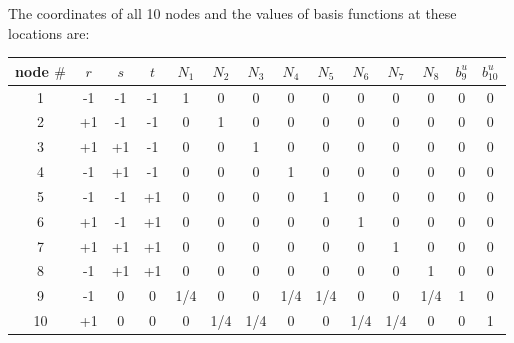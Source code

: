 The coordinates of all 10 nodes and the values of basis functions at these locations are:

\begin{center}
\begin{tabular}{c|ccc|cccccccc|cc}
\hline
node $\#$  & $r$ & $s$ & $t$ & $N_1$ & $N_2$ & $N_3$ & $N_4$ & $N_5$ & $N_6$ & $N_7$ & $N_8$ & $b_9^u$ & $b_{10}^u$\\
\hline\hline
1 & -1 & -1 & -1 & 1 & 0 & 0 & 0 & 0 & 0 & 0 & 0 & 0 & 0\\
2 & +1 & -1 & -1 & 0 & 1 & 0 & 0 & 0 & 0 & 0 & 0 & 0 & 0\\
3 & +1 & +1 & -1 & 0 & 0 & 1 & 0 & 0 & 0 & 0 & 0 & 0 & 0\\
4 & -1 & +1 & -1 & 0 & 0 & 0 & 1 & 0 & 0 & 0 & 0 & 0 & 0\\
5 & -1 & -1 & +1 & 0 & 0 & 0 & 0 & 1 & 0 & 0 & 0 & 0 & 0\\
6 & +1 & -1 & +1 & 0 & 0 & 0 & 0 & 0 & 1 & 0 & 0 & 0 & 0\\
7 & +1 & +1 & +1 & 0 & 0 & 0 & 0 & 0 & 0 & 1 & 0 & 0 & 0\\
8 & -1 & +1 & +1 & 0 & 0 & 0 & 0 & 0 & 0 & 0 & 1 & 0 & 0\\
9 & -1 & 0 & 0 & 1/4 & 0   & 0 & 1/4 & 1/4& 0   & 0 & 1/4 & 1 & 0\\
10& +1 & 0 & 0 & 0   & 1/4 & 1/4 & 0  &0 & 1/4 & 1/4 & 0 & 0 & 1\\
\hline
\end{tabular}
\end{center}

